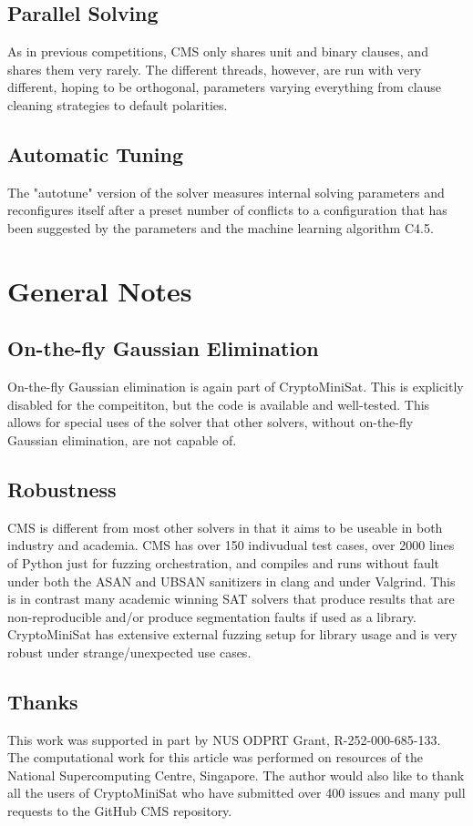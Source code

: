\documentclass[final]{ieee}
\begin{document}
\subsection{Parallel Solving}
As in previous competitions, CMS only shares unit and binary clauses, and shares them very rarely. The different threads, however, are run with very different, hoping to be orthogonal, parameters varying everything from clause cleaning strategies to default polarities.

\subsection{Automatic Tuning}
The "autotune" version of the solver measures internal solving parameters and reconfigures itself after a preset number of conflicts to a configuration that has been suggested by the parameters and the machine learning algorithm C4.5\cite{Salzberg1994}.

\section{General Notes}
\subsection{On-the-fly Gaussian Elimination}
On-the-fly Gaussian elimination is again part of CryptoMiniSat. This is explicitly disabled for the compeititon, but the code is available and well-tested. This allows for special uses of the solver that other solvers, without on-the-fly Gaussian elimination, are not capable of.

\subsection{Robustness}
CMS is different from most other solvers in that it aims to be useable in both industry and academia. CMS has over 150 indivudual test cases, over 2000 lines of Python just for fuzzing orchestration, and compiles and runs without fault under both the ASAN and UBSAN sanitizers in clang and under Valgrind. This is in contrast many academic winning SAT solvers that produce results that are non-reproducible and/or produce segmentation faults if used as a library. CryptoMiniSat has extensive external fuzzing setup for library usage and is very robust under strange/unexpected use cases.

\subsection{Thanks}
This work was supported in part by NUS ODPRT Grant, R-252-000-685-133. The computational work for this article was performed on resources of the National Supercomputing Centre, Singapore\cite{nscc}. The author would also like to thank all the users of CryptoMiniSat who have submitted over 400 issues and many pull requests to the GitHub CMS repository\cite{CMS}.





\vfill
\pagebreak
\end{document}
